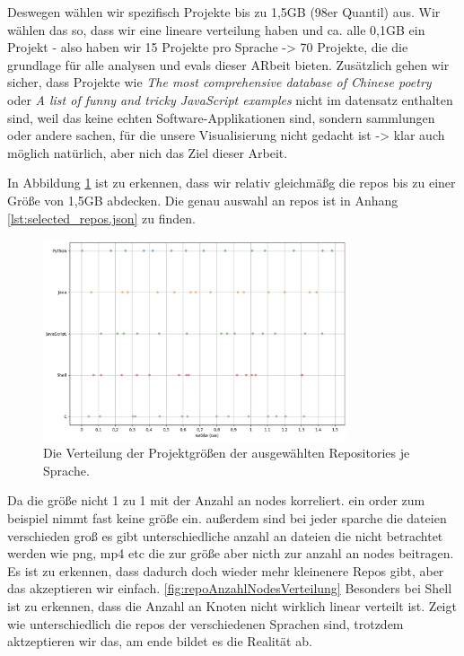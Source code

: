 Deswegen wählen wir spezifisch Projekte bis zu 1,5GB (98er Quantil) aus. Wir wählen das so, dass wir eine lineare verteilung haben und ca. alle 0,1GB ein Projekt - also haben wir 15 Projekte pro Sprache -> 70 Projekte, die die grundlage für alle analysen und evals dieser ARbeit bieten. 
Zusätzlich gehen wir sicher, dass Projekte  wie \textit{The most comprehensive database of Chinese poetry} oder \textit{A list of funny and tricky JavaScript examples} nicht im datensatz enthalten sind, weil das keine echten Software-Applikationen sind, sondern sammlungen oder andere sachen, für die unsere Visualisierung nicht gedacht ist -> klar auch möglich natürlich, aber nich das Ziel dieser Arbeit.

In Abbildung \ref{fig:repoGroesseVerteilung} ist zu erkennen, dass wir relativ gleichmäßg die repos bis zu einer Größe von 1,5GB abdecken.  Die genau auswahl an repos ist in Anhang \ref{lst:selected_repos.json} zu finden.
\begin{figure}
    \centering
    \includegraphics[width=0.8\textwidth]{images/datenanalyse/repoGrößeVerteilung.png}
    \caption{Die Verteilung der Projektgrößen der ausgewählten Repositories je Sprache.}
    \label{fig:repoGroesseVerteilung}
\end{figure}

Da die größe nicht 1 zu 1 mit der Anzahl an nodes korreliert. ein order zum beispiel nimmt fast keine größe ein. außerdem sind bei jeder sparche die dateien verschieden groß es gibt unterschiedliche anzahl an dateien die nicht betrachtet werden wie png, mp4 etc die zur größe aber nicth zur anzahl an nodes beitragen. Es ist zu erkennen, dass dadurch doch wieder mehr kleinenere Repos gibt, aber das akzeptieren wir einfach. \ref{fig:repoAnzahlNodesVerteilung} Besonders bei Shell ist zu erkennen, dass die Anzahl an Knoten nicht wirklich linear verteilt ist. Zeigt wie unterschiedlich die repos der verschiedenen Sprachen sind, trotzdem aktzeptieren wir das, am ende bildet es die Realität ab.

